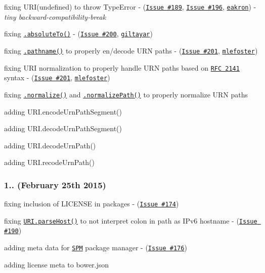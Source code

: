 \begin{DoxyItemize}
\item fixing {\ttfamily U\+R\+I(undefined)} to throw Type\+Error -\/ (\href{https://github.com/medialize/URI.js/issues/189}{\tt Issue \#189}, \href{https://github.com/medialize/URI.js/issues/196}{\tt Issue \#196}, \href{https://github.com/eakron}{\tt eakron}) -\/ {\itshape tiny backward-\/compatibility-\/break}
\item fixing \href{http://medialize.github.io/URI.js/docs.html#absoluteto}{\tt {\ttfamily .absolute\+To()}} -\/ (\href{https://github.com/medialize/URI.js/issues/200}{\tt Issue \#200}, \href{https://github.com/giltayar}{\tt giltayar})
\item fixing \href{http://medialize.github.io/URI.js/docs.html#accessors-pathname}{\tt {\ttfamily .pathname()}} to properly en/decode U\+RN paths -\/ (\href{https://github.com/medialize/URI.js/pull/201}{\tt Issue \#201}, \href{https://github.com/mlefoster}{\tt mlefoster})
\item fixing U\+RI normalization to properly handle U\+RN paths based on \href{https://www.ietf.org/rfc/rfc2141.txt}{\tt R\+FC 2141} syntax -\/ (\href{https://github.com/medialize/URI.js/pull/201}{\tt Issue \#201}, \href{https://github.com/mlefoster}{\tt mlefoster})
\begin{DoxyItemize}
\item fixing \href{http://medialize.github.io/URI.js/docs.html#normalize}{\tt {\ttfamily .normalize()}} and \href{http://medialize.github.io/URI.js/docs.html#normalize-path}{\tt {\ttfamily .normalize\+Path()}} to properly normalize U\+RN paths
\item adding {\ttfamily U\+R\+I.\+encode\+Urn\+Path\+Segment()}
\item adding {\ttfamily U\+R\+I.\+decode\+Urn\+Path\+Segment()}
\item adding {\ttfamily U\+R\+I.\+decode\+Urn\+Path()}
\item adding {\ttfamily U\+R\+I.\+recode\+Urn\+Path()}
\end{DoxyItemize}
\end{DoxyItemize}

\subsubsection*{1.. (February 25th 2015)}


\begin{DoxyItemize}
\item fixing inclusion of L\+I\+C\+E\+N\+SE in packages -\/ (\href{https://github.com/medialize/URI.js/issues/174}{\tt Issue \#174})
\item fixing \href{http://medialize.github.io/URI.js/docs.html#static-parseHost}{\tt {\ttfamily U\+R\+I.\+parse\+Host()}} to not interpret colon in path as I\+Pv6 hostname -\/ (\href{https://github.com/medialize/URI.js/issues/190}{\tt Issue \#190})
\item adding meta data for \href{http://www.spmjs.io/}{\tt S\+PM} package manager -\/ (\href{https://github.com/medialize/URI.js/issues/176}{\tt Issue \#176})
\item adding license meta to {\ttfamily bower.\+json}
\end{DoxyItemize}

